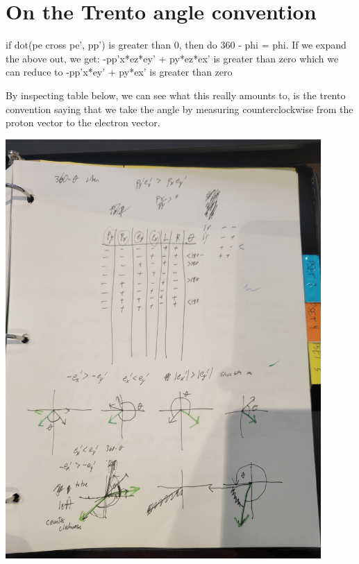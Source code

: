 \chapter{On the Trento angle convention}

if dot(pe cross pe', pp') is greater than 0, then do 360 - phi = phi.
If we expand the above out, we get:
-pp'x*ez*ey' + py*ez*ex' is greater than zero
which we can reduce to 
-pp'x*ey' + py*ex' is greater than zero

By inspecting table below, we can see what this really amounts to, is the trento convention saying that we take the angle by measuring counterclockwise from the proton vector to the electron vector.


\includegraphics[width=0.9\textwidth]{basics/phi_math_1.jpg}